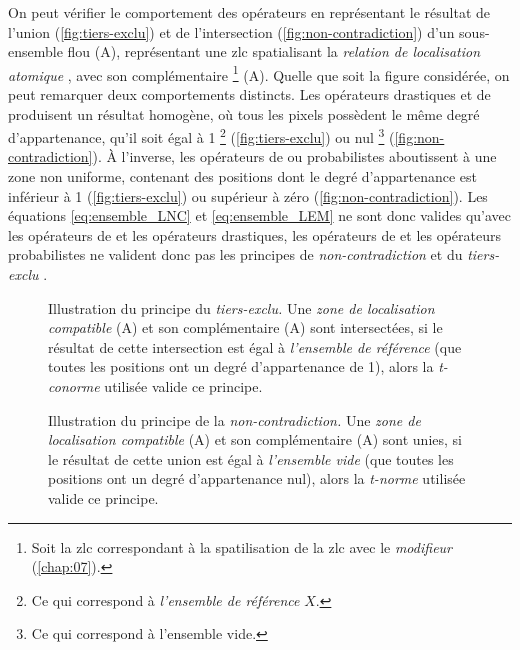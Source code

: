 On peut vérifier le comportement des opérateurs en représentant le
résultat de l'union (\autoref{fig:tiers-exclu}) et de l'intersection
(\autoref{fig:non-contradiction}) d'un sous-ensemble flou
(\textcolor{RdBu-9-1}{\textsf{A}}), représentant une \ac{zlc}
spatialisant la \emph{relation de localisation atomique}
, avec son complémentaire \footnote{Soit la
  \ac{zlc} correspondant à la spatilisation de la \ac{zlc}
   avec le \emph{modifieur} 
  (\autoref{chap:07}).}
(\textcolor{RdBu-9-9}{\textsf{A}}). Quelle que soit la figure
considérée, on peut remarquer deux comportements distincts. Les
opérateurs drastiques et de  produisent un résultat
homogène, où tous les pixels possèdent le même degré d'appartenance,
qu'il soit égal à 1 \footnote{Ce qui correspond à \emph{l'ensemble de
    référence} \(X\).} (\autoref{fig:tiers-exclu}) ou nul \footnote{Ce
  qui correspond à l'ensemble vide.}
(\autoref{fig:non-contradiction}). À l'inverse, les opérateurs de
 ou probabilistes aboutissent à une zone non uniforme,
contenant des positions dont le degré d'appartenance est inférieur à 1
(\autoref{fig:tiers-exclu}) ou supérieur à zéro
(\autoref{fig:non-contradiction}). Les équations \ref{eq:ensemble_LNC}
et \ref{eq:ensemble_LEM} ne sont donc valides qu'avec les opérateurs
de  et les opérateurs drastiques, les opérateurs de
 et les opérateurs probabilistes ne valident donc pas les
principes de \emph{non-contradiction} et du \emph{tiers-exclu}
\autocite{Bouchon-Meunier2007}.

\begin{figure}
  \centering
  
  \caption[Illustration du principe du
  \emph{tiers-exclu}]{Illustration du principe du \emph{tiers-exclu.}
    Une \emph{zone de localisation compatible}
    (\textcolor{RdBu-9-1}{\textsf{A}}) et son complémentaire
    (\textcolor{RdBu-9-9}{\textsf{A}}) sont intersectées, si le
    résultat de cette intersection est égal à \emph{l'ensemble de
      référence} (\ie que toutes les positions ont un degré
    d'appartenance de 1), alors la \emph{t-conorme} utilisée valide ce
    principe.}
  \label{fig:tiers-exclu}
\end{figure}

\begin{figure}
  \centering
  
  \caption[Illustration du principe de la
  \emph{non-contradiction}]{Illustration du principe de la
    \emph{non-contradiction.} Une \emph{zone de localisation
      compatible} (\textcolor{RdBu-9-1}{\textsf{A}}) et son
    complémentaire (\textcolor{RdBu-9-9}{\textsf{A}}) sont
    unies, si le résultat de cette union est égal à \emph{l'ensemble
      vide} (\ie que toutes les positions ont un degré d'appartenance
    nul), alors la \emph{t-norme} utilisée valide ce principe.}
  \label{fig:non-contradiction}
\end{figure}

